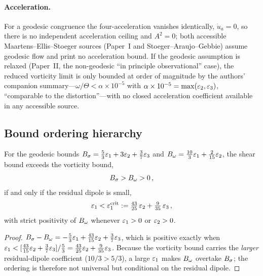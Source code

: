 \paragraph{Acceleration.}
For a geodesic congruence the four-acceleration vanishes identically,
$\dot{u}_a = 0$, so there is no independent acceleration ceiling and
$A^2 = 0$; both accessible Maartens--Ellis--Stoeger sources (Paper~I and
Stoeger--Araujo--Gebbie) assume geodesic flow and print no acceleration
bound.  If the geodesic assumption is relaxed (Paper~II, the
non-geodesic ``in principle observational'' case), the reduced vorticity
limit is only bounded at order of magnitude by the authors' companion
summary---$\omega/\Theta < \alpha\times10^{-5}$ with
$\alpha\times10^{-5} = \max(\varepsilon_2,\varepsilon_3)$, ``comparable to the
distortion''---with no closed acceleration coefficient available in any
accessible source.


\subsection{Bound ordering hierarchy}\label{sec:hierarchy}

\begin{proposition}\label{prop:ordering}
For the geodesic bounds $B_\sigma = \tfrac53\varepsilon_1 + 3\varepsilon_2 +
\tfrac37\varepsilon_3$ and $B_\omega = \tfrac{10}{3}\varepsilon_1 + \tfrac{2}{15}\varepsilon_2$,
the shear bound exceeds the vorticity bound,
\begin{equation}\label{eq:ordering-weak}
B_\sigma > B_\omega > 0\,,
\end{equation}
if and only if the residual dipole is small,
\begin{equation}\label{eq:ordering-strict}
\varepsilon_1 < \varepsilon_1^{\mathrm{crit}}
:= \tfrac{43}{25}\,\varepsilon_2 + \tfrac{9}{35}\,\varepsilon_3\,,
\end{equation}
with strict positivity of $B_\omega$ whenever $\varepsilon_1 > 0$ or $\varepsilon_2 > 0$.
\end{proposition}

\begin{proof}
$B_\sigma - B_\omega = -\tfrac53\varepsilon_1 + \tfrac{43}{15}\varepsilon_2 + \tfrac37\varepsilon_3$,
which is positive exactly when
$\varepsilon_1 < [\tfrac{43}{15}\varepsilon_2 + \tfrac37\varepsilon_3]/\tfrac53
= \tfrac{43}{25}\varepsilon_2 + \tfrac{9}{35}\varepsilon_3$.  Because the vorticity
bound carries the \emph{larger} residual-dipole coefficient
($10/3 > 5/3$), a large $\varepsilon_1$ makes $B_\omega$ overtake $B_\sigma$; the
ordering is therefore not universal but conditional on the residual
dipole.
\end{proof}

